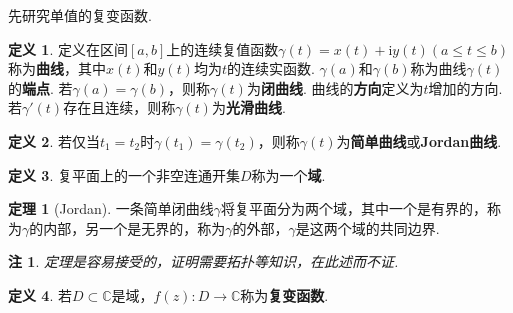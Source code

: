 \documentclass[12pt]{ctexart}
\theoremstyle{definition}
\newtheorem{definition}{定义}
\newtheorem{theorem}{定理}
\theoremstyle{plain}
\newtheorem*{remark}{注}
\newcommand{\iu}{\mathrm{i}}
\begin{document}
	先研究单值的复变函数. 
	\begin{definition}
		定义在区间$[a,b]$上的连续复值函数$\gamma(t)=x(t)+\iu y(t)(a\leqslant t\leqslant b)$称为\textbf{曲线}，其中$x(t)$和$y(t)$均为$t$的连续实函数. $\gamma(a)$和$\gamma(b)$称为曲线$\gamma(t)$的\textbf{端点}. 若$\gamma(a)=\gamma(b)$，则称$\gamma(t)$为\textbf{闭曲线}. 曲线的\textbf{方向}定义为$t$增加的方向. 若$\gamma'(t)$存在且连续，则称$\gamma(t)$为\textbf{光滑曲线}.
	\end{definition}
	\begin{definition}
		若仅当$t_1=t_2$时$\gamma(t_1)=\gamma(t_2)$，则称$\gamma(t)$为\textbf{简单曲线}或\textbf{Jordan曲线}.
	\end{definition}
	\begin{definition}
		复平面上的一个非空连通开集$D$称为一个\textbf{域}.
	\end{definition}
	\begin{theorem}[Jordan]
		一条简单闭曲线$\gamma$将复平面分为两个域，其中一个是有界的，称为$\gamma$的内部，另一个是无界的，称为$\gamma$的外部，$\gamma$是这两个域的共同边界.
	\end{theorem}
	\begin{remark}
		定理是容易接受的，证明需要拓扑等知识，在此述而不证.
	\end{remark}
	\begin{definition}
		若$D\subset\mathbb{C}$是域，$f(z):D\to\mathbb{C}$称为\textbf{复变函数}.
	\end{definition}
\end{document}
